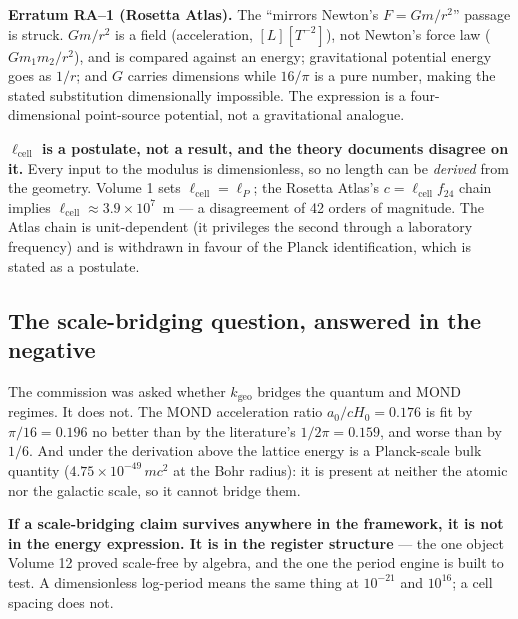 \documentclass[11pt, letterpaper, openany]{book}
\newcommand{\kgeo}{k_{\mathrm{geo}}}
\begin{document}
\begin{erratumbox}
\textbf{Erratum RA--1 (Rosetta Atlas).} The ``mirrors Newton's $F = Gm/r^2$'' passage is struck.
$Gm/r^2$ is a field (acceleration, $[L][T^{-2}]$), not Newton's force law ($Gm_1m_2/r^2$), and is
compared against an energy; gravitational potential energy goes as $1/r$; and $G$ carries
dimensions while $16/\pi$ is a pure number, making the stated substitution dimensionally
impossible. The expression is a four-dimensional point-source potential, not a gravitational
analogue.
\end{erratumbox}

\begin{correctionbox}
\textbf{$\ell_{\mathrm{cell}}$ is a postulate, not a result, and the theory documents disagree
on it.} Every input to the modulus is dimensionless, so no length can be \emph{derived} from the
geometry. Volume 1 sets $\ell_{\mathrm{cell}} = \ell_P$; the Rosetta Atlas's $c = \ell_{\mathrm{cell}}
f_{24}$ chain implies $\ell_{\mathrm{cell}} \approx 3.9\times10^{7}$~m --- a disagreement of 42
orders of magnitude. The Atlas chain is unit-dependent (it privileges the second through a
laboratory frequency) and is withdrawn in favour of the Planck identification, which is stated as
a postulate.
\end{correctionbox}

\subsection{The scale-bridging question, answered in the negative}

\begin{nullbox}
The commission was asked whether $\kgeo$ bridges the quantum and MOND regimes. It does not. The
MOND acceleration ratio $a_0 / cH_0 = 0.176$ is fit by $\pi/16 = 0.196$ no better than by the
literature's $1/2\pi = 0.159$, and worse than by $1/6$. And under the derivation above the lattice
energy is a Planck-scale bulk quantity ($4.75\times10^{-49}\,mc^2$ at the Bohr radius): it is
present at neither the atomic nor the galactic scale, so it cannot bridge them.

\medskip
\noindent \textbf{If a scale-bridging claim survives anywhere in the framework, it is not in the
energy expression. It is in the register structure} --- the one object Volume 12 proved
scale-free by algebra, and the one the period engine is built to test. A dimensionless log-period
means the same thing at $10^{-21}$ and $10^{16}$; a cell spacing does not.
\end{nullbox}
\end{document}
